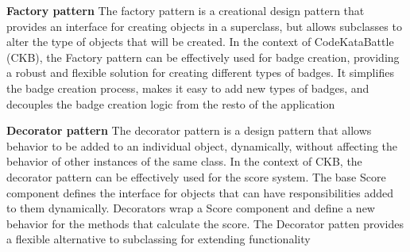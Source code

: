 \textbf{Factory pattern}\newline
The factory pattern is a creational design pattern that provides an interface for creating objects in a superclass, but allows subclasses to 
alter the type of objects that will be created. In the context of CodeKataBattle (CKB), the Factory pattern can be effectively used for badge creation, 
providing a robust and flexible solution for creating different types of badges. It simplifies the badge creation process, 
makes it easy to add new types of badges, and decouples the badge creation logic from the resto of the application

\textbf{Decorator pattern}\newline
The decorator pattern is a design pattern that allows behavior to be added to an individual object, dynamically, without affecting the behavior of other instances of the same class. 
In the context of CKB, the decorator pattern can be effectively used for the score system. 
The base Score component defines the interface for objects that can have responsibilities added to them dynamically. 
Decorators wrap a Score component and define a new behavior for the methods that calculate the score.\newline
The Decorator patten provides a flexible alternative to subclassing for extending functionality